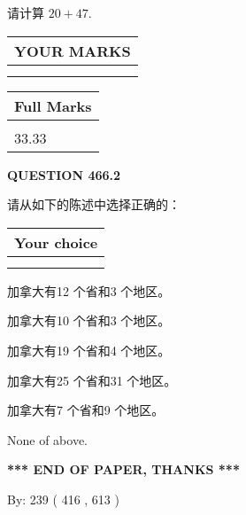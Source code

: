 \documentclass{ctexart}
\begin{document}
  
 
请计算 $ %
20 +  %
47 $.
 

 

 
  
\vspace{0.2in}
  
\noindent\begin{tabular}{|l|}
\hline
 YOUR MARKS  \\
\hline
 \\ 
 \\ 
\hline
\end{tabular}
\hspace{0.05in} \begin{tabular}{|l|}
\hline
 Full Marks  \\
\hline
 \\ 
33.33 \\
\hline
\end{tabular}
{\textbf{\Large{QUESTION
466.2 
}}}
  
  
请从如下的陈述中选择正确的：
  
  
\noindent\hspace{3.0in} \begin{tabular}{|l|}
\hline
Your choice \\
\hline
 \\ 
 \\ 
\hline
\end{tabular}
  
  
 
 
加拿大有12 个省和3 个地区。
 
 
加拿大有10 个省和3 个地区。
 
 
加拿大有19 个省和4 个地区。
 
 
加拿大有25 个省和31 个地区。
 
 
加拿大有7 个省和9 个地区。
 
 
 None of above.
 
 
   
   
 \vspace{0.2in}
 
   
   
   
   
\vspace{1.0in} 
{\textbf{\large{ *** END OF PAPER, THANKS *** }}} 
   
   
\hspace{1.0in} By: 
 239 ( 416 ,  613 )
   
\end{document}
